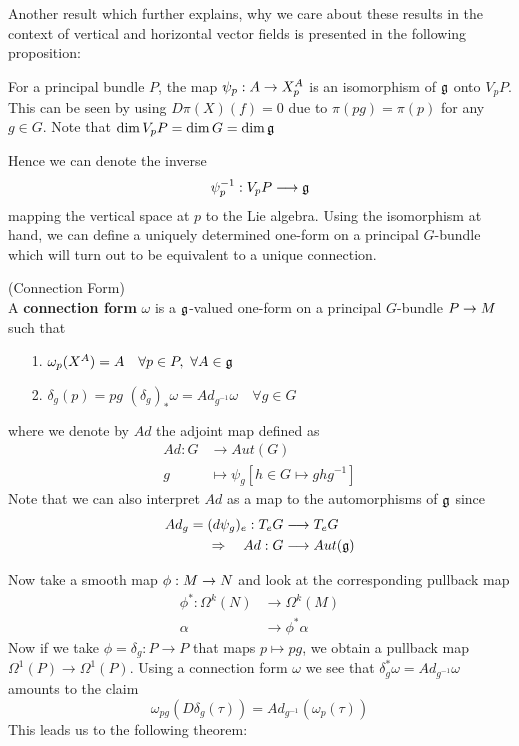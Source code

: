 Another result which further explains, why we care about these results in the context of vertical and horizontal vector fields is presented in the following proposition:

\begin{prop}
 For a principal bundle $P$, the map $\psi_p : A \rightarrow X^A_p$ is an isomorphism of $\mathfrak{g}$ onto $V_pP$. This can be seen by using $D\pi(X)(f) = 0$ due to $\pi(pg) = \pi(p)$ for any $g\in G$. Note that $\dim V_pP = \dim G = \dim \mathfrak{g}$
\end{prop}

Hence we can denote the inverse
$$ \psi^{-1}_p: V_pP \longrightarrow \mathfrak{g} $$
mapping the vertical space at $p$ to the Lie algebra. Using the isomorphism at hand, we can define a uniquely determined one-form on a principal $G$-bundle which will turn out to be equivalent to a unique connection.

\begin{definition}
\label{Connection_Form}
(Connection Form)\\
  A \textbf{connection form} $\omega$ is a $\mathfrak{g}$-valued one-form on a principal $G$-bundle $P \rightarrow M$ such that
  \begin{itemize}
    \item[1.] $\omega_p(X^A) = A \quad \forall p \in P, \ \forall A \in \mathfrak{g}$
    \item[2.] $\delta_g (p) = pg$ \quad \quad $(\delta_g)_* \omega = Ad_{g^{-1}} \omega \quad \forall g \in G$
  \end{itemize}
  where we denote by $Ad$ the adjoint map defined as
  \begin{align}
    Ad: G &\longrightarrow Aut(G)\\
    g &\longmapsto \psi_g [h \in G \longmapsto ghg^{-1}]
  \end{align}
  Note that we can also interpret $Ad$ as a map to the automorphisms of $\mathfrak{g}$ since
  \begin{align}
    Ad_g = (d\psi_g)_e : T_eG &\longrightarrow T_eG\\
    \Rightarrow \quad Ad: G &\longrightarrow Aut(\mathfrak{g})
  \end{align}
\end{definition}

Now take a smooth map $\phi:M \ra N$ and look at the corresponding pullback map
\begin{align}
  \phi^*: \Omega^k(N) &\longrightarrow \Omega^k(M)\\
  \alpha &\longrightarrow \phi^*\alpha
\end{align}
Now if we take $\phi = \delta_g : P \longrightarrow P$ that maps $p \mapsto pg$, we obtain a pullback map $\Omega^1(P) \longrightarrow \Omega^1(P)$. Using a connection form $\omega$ we see that $\delta_g^* \omega = Ad_{g^{-1}}\omega$ amounts to the claim
$$\omega_{pg}(D\delta_g(\tau)) = Ad_{g^{-1}}(\omega_p(\tau))$$
This leads us to the following theorem:

